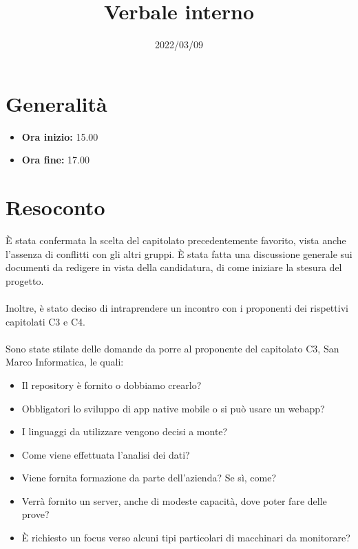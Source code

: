 \documentclass{classes/base}
\title{Verbale interno}
\date{2022/03/09}
\author{\matteo}
\renewcommand{\maketitle}{
    
}
\begin{document}
    \maketitle

    \section{Generalità}
    \begin{itemize}
        \item \textbf{Ora inizio:} 15.00
        \item \textbf{Ora fine:} 17.00
    \end{itemize}

    \section{Resoconto}
    È stata confermata la scelta del capitolato precedentemente favorito, vista anche l'assenza di conflitti con gli altri gruppi.
    È stata fatta una discussione generale sui documenti da redigere in vista della candidatura, di come iniziare la stesura del progetto.
    \\\\
    Inoltre, è stato deciso di intraprendere un incontro con i proponenti dei rispettivi capitolati C3 e C4.
    \\\\
    Sono state stilate delle domande da porre al proponente del capitolato C3, San Marco Informatica, le quali:
    \begin{itemize}
        \item  Il repository è fornito o dobbiamo crearlo?
        \item  Obbligatori lo sviluppo di app native mobile o si può usare un webapp?
        \item  I linguaggi da utilizzare vengono decisi a monte? 
        \item  Come viene effettuata l'analisi dei dati?
        \item  Viene fornita formazione da parte dell'azienda? Se sì, come?
        \item  Verrà fornito un server, anche di modeste capacità, dove poter fare delle prove?
        \item  È richiesto un focus verso alcuni tipi particolari di macchinari da monitorare?
    \end{itemize}
\end{document}
